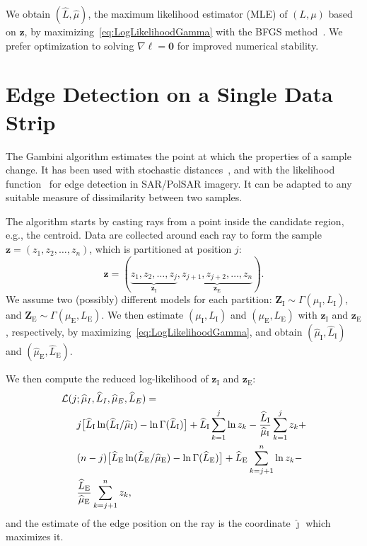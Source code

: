 \documentclass[journal]{IEEEtran}
\begin{document}
We obtain $(\widehat L, \widehat \mu)$, the maximum likelihood estimator (MLE) of $(L, \mu)$ based on $\bm z$, by maximizing~\eqref{eq:LogLikelihoodGamma} with the BFGS method~\cite{ht}.
We prefer optimization to solving $\nabla\ell=\bm 0$ for improved numerical stability.

\section{Edge Detection on a Single Data Strip}\label{sec_03}

The Gambini algorithm estimates the point at which the properties of a sample change.
It has been used with stochastic distances~\cite{nhfc}, and with the likelihood function~\cite{gmbf, fbgm} for edge detection in SAR/PolSAR imagery.
It can be adapted to any suitable measure of dissimilarity between two samples.

The algorithm starts by casting rays from a point inside the candidate region, e.g., the centroid.
Data are collected around each ray to form the sample $\bm z = (z_1,z_2,\dots,z_n)$, which is partitioned at position $j$:
$$
\bm z = (\underbrace{z_1,z_2,\dots,z_j}_{\bm z_\text{I}}, 
\underbrace{z_{j+1}, z_{j+2},\dots,z_n}_{\bm z_\text{E}}).
$$
We assume two (possibly) different models for each partition:
$\bm Z_\text{I} \sim \Gamma(\mu_\text{I},L_\text{I})$, and 
$\bm Z_\text{E} \sim \Gamma(\mu_\text{E},L_\text{E})$.
We then estimate $(\mu_\text{I},L_\text{I})$ and $(\mu_\text{E},L_\text{E})$ with $\bm z_\text{I}$ and $\bm z_\text{E}$, respectively, by maximizing~\eqref{eq:LogLikelihoodGamma}, and obtain $(\widehat{\mu}_\text{I}, \widehat{L}_\text{I})$ and $(\widehat{\mu}_\text{E}, \widehat{L}_\text{E})$.

We then compute the reduced log-likelihood of $\bm z_\text{I}$ and $\bm z_\text{E}$:
\begin{equation}\label{eq:TotalLogLikelihood}
\begin{aligned}
\mathcal L(j&;\widehat{\mu}_I, \widehat{L}_I,\widehat{\mu}_E, \widehat{L}_E)=\\
&j \big[\widehat{L}_\text{I}\ln (\widehat{L}_\text{I} / \widehat{\mu}_\text{I}) - \ln \Gamma(\widehat{L}_\text{I})\big]
+\widehat{L}_\text{I} \sum_{k=1}^{j}\ln z_k -\frac{\widehat{L}_\text{I}}{\widehat{\mu}_\text{I}}\sum_{k=1}^{j} z_k +\\
&(n-j) \big[\widehat{L}_\text{E}\ln (\widehat{L}_\text{E} / \widehat{\mu}_\text{E}) - \ln \Gamma(\widehat{L}_\text{E})\big]
+\widehat{L}_\text{E} \sum_{k=j+1}^{n}\ln z_k -\\ &\frac{\widehat{L}_\text{E}}{\widehat{\mu}_\text{E}}\sum_{k=j+1}^{n} z_k,
\raisetag{2.2em}
\end{aligned}
\end{equation}
and the estimate of the edge position on the ray is the coordinate $\widehat\jmath$ which maximizes it.
\end{document}
